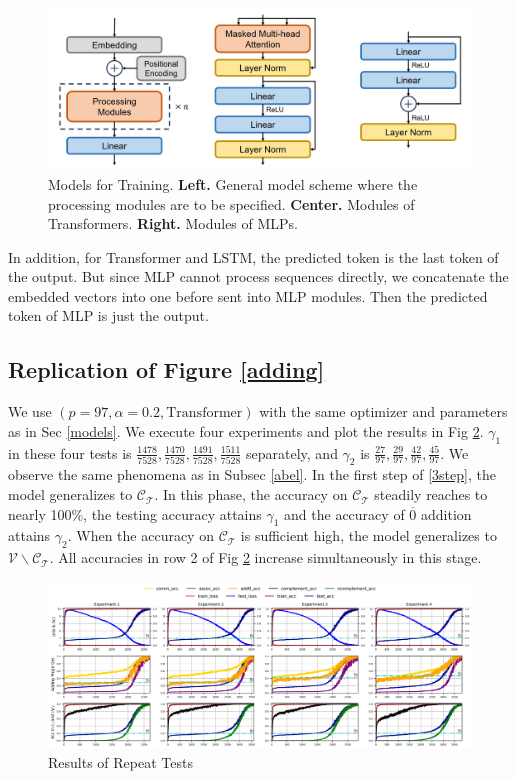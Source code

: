\documentclass{article}
\begin{document}
\begin{figure}[htbp]
  \centering
  \includegraphics[width=.72\textwidth]{./pic/module.png}
  \caption{Models for Training. \textbf{Left.} General model scheme where the processing modules are to be specified. \textbf{Center.} Modules of Transformers. \textbf{Right.} Modules of MLPs.}
  \label{modules}
\end{figure}

In addition, for Transformer and LSTM, the predicted token is the last token of the output. But since MLP cannot process sequences directly, we concatenate the embedded vectors into one before sent into MLP modules. Then the predicted token of MLP is just the output.

\subsection{Replication of Figure \ref{adding}}
\label{appendix-repeat}

We use $(p = 97, \alpha = 0.2, \text{Transformer})$ with the same optimizer and parameters as in Sec \ref{models}. We execute four experiments and plot the results in Fig \ref{repeat1}. $\gamma_1$ in these four tests is $\frac{1478}{7528}, \frac{1470}{7528}, \frac{1491}{7528}, \frac{1511}{7528}$ separately, and $\gamma_2$ is $\frac{27}{97}, \frac{29}{97}, \frac{42}{97}, \frac{45}{97}$. We observe the same phenomena as in Subsec \ref{abel}. In the first step of \eqref{3step}, the model generalizes to $\mathcal{C_T}$. In this phase, the accuracy on $\mathcal{C_T}$ steadily reaches to nearly 100\%, the testing accuracy attains $\gamma_1$ and the accuracy of $\overline{0}$ addition attains $\gamma_2$. When the accuracy on $\mathcal{C_T}$ is sufficient high, the model generalizes to $\mathcal{V}\backslash\mathcal{C_T}$. All accuracies in row 2 of Fig \ref{repeat1} increase simultaneously in this stage.

\begin{figure}[htbp]
  \centering
  \includegraphics[width=\textwidth]{./pic/ap1.png}
  \caption{Results of Repeat Tests}
  \label{repeat1}
\end{figure}
\end{document}
